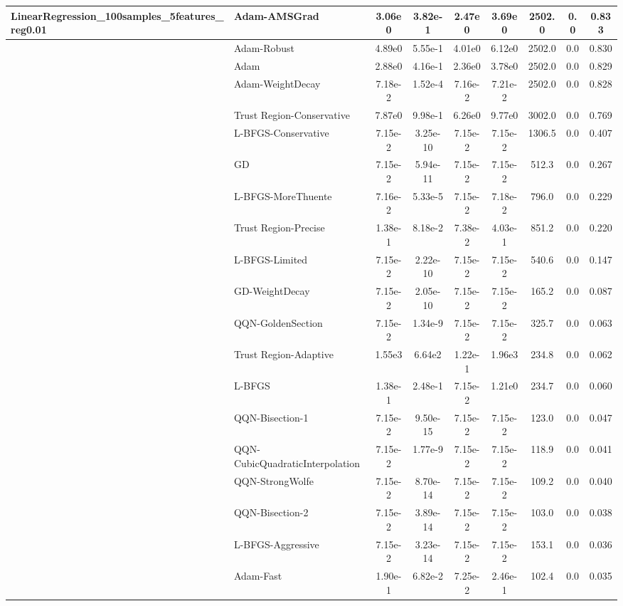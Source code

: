 \documentclass[10pt]{article}
\begin{document}
\begin{longtable}{|l|l|c|c|c|c|c|c|c|}
LinearRegression\_100samples\_5features\_reg0.01 & \textbf{Adam-AMSGrad} & 3.06e0 & 3.82e-1 & 2.47e0 & 3.69e0 & 2502.0 & 0.0 & 0.833 \\
\hline
 & Adam-Robust & 4.89e0 & 5.55e-1 & 4.01e0 & 6.12e0 & 2502.0 & 0.0 & 0.830 \\
\hline
 & Adam & 2.88e0 & 4.16e-1 & 2.36e0 & 3.78e0 & 2502.0 & 0.0 & 0.829 \\
\hline
 & Adam-WeightDecay & 7.18e-2 & 1.52e-4 & 7.16e-2 & 7.21e-2 & 2502.0 & 0.0 & 0.828 \\
\hline
 & Trust Region-Conservative & 7.87e0 & 9.98e-1 & 6.26e0 & 9.77e0 & 3002.0 & 0.0 & 0.769 \\
\hline
 & L-BFGS-Conservative & 7.15e-2 & 3.25e-10 & 7.15e-2 & 7.15e-2 & 1306.5 & 0.0 & 0.407 \\
\hline
 & GD & 7.15e-2 & 5.94e-11 & 7.15e-2 & 7.15e-2 & 512.3 & 0.0 & 0.267 \\
\hline
 & L-BFGS-MoreThuente & 7.16e-2 & 5.33e-5 & 7.15e-2 & 7.18e-2 & 796.0 & 0.0 & 0.229 \\
\hline
 & Trust Region-Precise & 1.38e-1 & 8.18e-2 & 7.38e-2 & 4.03e-1 & 851.2 & 0.0 & 0.220 \\
\hline
 & L-BFGS-Limited & 7.15e-2 & 2.22e-10 & 7.15e-2 & 7.15e-2 & 540.6 & 0.0 & 0.147 \\
\hline
 & GD-WeightDecay & 7.15e-2 & 2.05e-10 & 7.15e-2 & 7.15e-2 & 165.2 & 0.0 & 0.087 \\
\hline
 & QQN-GoldenSection & 7.15e-2 & 1.34e-9 & 7.15e-2 & 7.15e-2 & 325.7 & 0.0 & 0.063 \\
\hline
 & Trust Region-Adaptive & 1.55e3 & 6.64e2 & 1.22e-1 & 1.96e3 & 234.8 & 0.0 & 0.062 \\
\hline
 & L-BFGS & 1.38e-1 & 2.48e-1 & 7.15e-2 & 1.21e0 & 234.7 & 0.0 & 0.060 \\
\hline
 & QQN-Bisection-1 & 7.15e-2 & 9.50e-15 & 7.15e-2 & 7.15e-2 & 123.0 & 0.0 & 0.047 \\
\hline
 & QQN-CubicQuadraticInterpolation & 7.15e-2 & 1.77e-9 & 7.15e-2 & 7.15e-2 & 118.9 & 0.0 & 0.041 \\
\hline
 & QQN-StrongWolfe & 7.15e-2 & 8.70e-14 & 7.15e-2 & 7.15e-2 & 109.2 & 0.0 & 0.040 \\
\hline
 & QQN-Bisection-2 & 7.15e-2 & 3.89e-14 & 7.15e-2 & 7.15e-2 & 103.0 & 0.0 & 0.038 \\
\hline
 & L-BFGS-Aggressive & 7.15e-2 & 3.23e-14 & 7.15e-2 & 7.15e-2 & 153.1 & 0.0 & 0.036 \\
\hline
 & Adam-Fast & 1.90e-1 & 6.82e-2 & 7.25e-2 & 2.46e-1 & 102.4 & 0.0 & 0.035 \\

\end{longtable}
\end{document}
